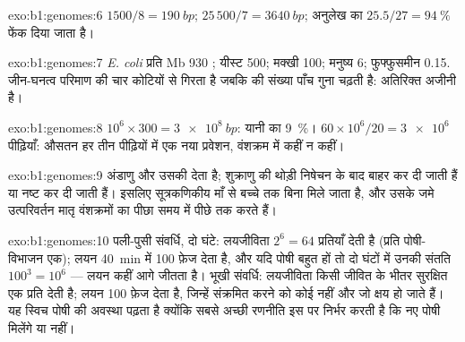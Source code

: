 \begin{solution}{exo:b1:genomes:6}
 $1500/8 = \qty{190}{bp}$;  $25\,500/7 = \qty{3640}{bp}$;
अनुलेख का $25.5/27 = \qty{94}{\%}$ फेंक दिया जाता है।
\end{solution}

\begin{solution}{exo:b1:genomes:7}
\emph{E. coli} प्रति Mb 930 ; यीस्ट 500; मक्खी 100; मनुष्य 6;
फुफ्फुसमीन 0.15. जीन-घनत्व परिमाण की चार कोटियों से गिरता है जबकि
 की संख्या पाँच गुना चढ़ती है: अतिरिक्त  अजीनी है।
\end{solution}

\begin{solution}{exo:b1:genomes:8}
$10^6\times 300 = \qty{3e8}{bp}$: यानी  का \qty{9}{\%}। $60\times
10^6/20 = \num{3e6}$ पीढ़ियाँ: औसतन हर तीन पीढ़ियों में एक नया प्रवेशन,
वंशक्रम में कहीं न कहीं।
\end{solution}

\begin{solution}{exo:b1:genomes:9}
अंडाणु  और उसकी  देता है; शुक्राणु की
थोड़ी  निषेचन के बाद बाहर कर दी जाती हैं या नष्ट कर दी जाती
हैं। इसलिए सूत्रकणिकीय  माँ से बच्चे तक बिना मिले जाता है, और
उसके जमे उत्परिवर्तन मातृ वंशक्रमों का पीछा समय में पीछे तक करते हैं।
\end{solution}

\begin{solution}{exo:b1:genomes:10}
पली-पुसी संवर्धि, दो घंटे: लयजीविता $2^6 = 64$ प्रतियाँ देती है (प्रति
पोषी-विभाजन एक); लयन \qty{40}{min} में 100 फ़ेज देता है, और यदि पोषी बहुत
हों तो दो घंटों में उनकी संतति $100^3 = 10^6$ --- लयन कहीं आगे जीतता
है। भूखी संवर्धि: लयजीविता किसी जीवित  के भीतर सुरक्षित एक प्रति
देती है; लयन 100 फ़ेज देता है, जिन्हें संक्रमित करने को कोई  नहीं और
जो क्षय हो जाते हैं। यह स्विच पोषी की अवस्था पढ़ता है क्योंकि सबसे अच्छी
रणनीति इस पर निर्भर करती है कि नए पोषी मिलेंगे या नहीं।
\end{solution}

